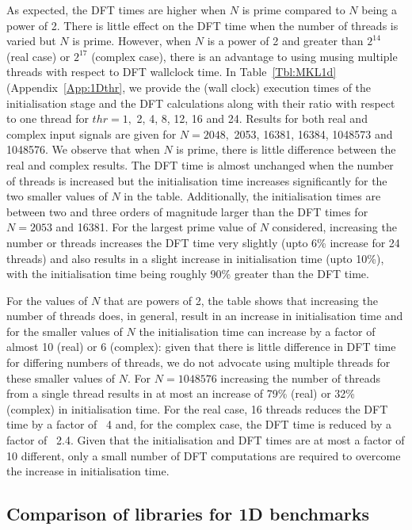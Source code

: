 \documentclass[a4paper]{article}
\begin{document}
As expected, the DFT times are higher when $N$ is prime compared to
$N$ being a power of 2. There is little effect on the DFT time when
the number of threads is varied but $N$ is prime. However, when $N$ is
a power of 2 and greater than $2^{14}$ (real case) or $2^{17}$
(complex case), there is an advantage to using musing multiple threads
with respect to DFT wallclock time. In Table~\ref{Tbl:MKL1d}
(Appendix~\ref{App:1Dthr}, we provide the (wall clock) execution times
of the initialisation stage and the DFT calculations along with their
ratio with respect to one thread for $thr=1,$ 2, 4, 8, 12, 16 and
24. Results for both real and complex input signals are given for
$N=2048,$ 2053, 16381, 16384, 1048573 and 1048576. We observe that
when $N$ is prime, there is little difference between the real and
complex results. The DFT time is almost unchanged when the number of
threads is increased but the initialisation time increases
significantly for the two smaller values of $N$ in the
table. Additionally, the initialisation times are between two and
three orders of magnitude larger than the DFT times for $N=2053$ and
16381. For the largest prime value of $N$ considered, increasing the
number or threads increases the DFT time very slightly (upto 6\%
increase for 24 threads) and also results in a slight increase in
initialisation time (upto 10\%), with the initialisation time being
roughly 90\% greater than the DFT time.

For the values of $N$ that are powers of 2, the table shows that
increasing the number of threads does, in general, result in an
increase in initialisation time and for the smaller values of $N$ the
initialisation time can increase by a factor of almost 10 (real) or 6
(complex): given that there is little difference in DFT time for
differing numbers of threads, we do not advocate using multiple
threads for these smaller values of $N.$ For $N=1048576$ increasing
the number of threads from a single thread results in at most an
increase of 79\% (real) or 32\% (complex) in initialisation time. For
the real case, 16 threads reduces the DFT time by a factor of ~4 and,
for the complex case, the DFT time is reduced by a factor of
~2.4. Given that the initialisation and DFT times are at most a factor
of 10 different, only a small number of DFT computations are required
to overcome the increase in initialisation time.








\subsection{Comparison of libraries for 1D benchmarks}\label{Sec:1DComp}
\end{document}
